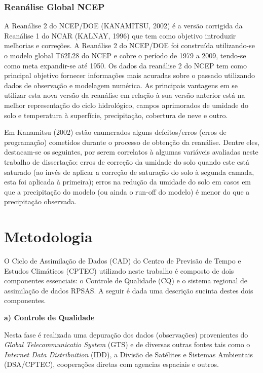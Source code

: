 \subsubsection{Reanálise Global NCEP}

A Reanálise 2 do NCEP/DOE (KANAMITSU, 2002) é a versão corrigida da Reanálise 1 do NCAR (KALNAY, 1996) que tem como objetivo introduzir melhorias e correções. A Reanálise 2 do NCEP/DOE foi construída utilizando-se o modelo global T62L28 do NCEP e cobre o período de 1979 a 2009, tendo-se como meta expandir-se até 1950. Os dados da reanálise 2 do NCEP tem como principal objetivo fornecer informações mais acuradas sobre o passado utilizando dados de observação e modelagem numérica. As principais vantagens em se utilizar esta nova versão da reanálise em relação à sua versão anterior está na melhor representação do ciclo hidrológico, campos aprimorados de umidade do solo e temperatura à superfície, precipitação, cobertura de neve e outro.

Em Kanamitsu (2002) estão enumerados alguns defeitos/erros (erros de programação) cometidos durante o processo de obtenção da reanálise. Dentre eles, destacam-se os seguintes, por serem correlatos à algumas variáveis avaliadas neste trabalho de dissertação: erros de correção da umidade do solo quando este está saturado (ao invés de aplicar a correção de saturação do solo à segunda camada, esta foi aplicada à primeira); erros na redução da umidade do solo em casos em que a precipitação do modelo (ou ainda o run-off do modelo) é menor do que a precipitação observada.

\section{Metodologia}
\label{ss:metodologia}

O Ciclo de Assimilação de Dados (CAD) do Centro de Previsão de Tempo e Estudos Climáticos (CPTEC) utilizado neste trabalho é composto de dois  componentes essenciais: o Controle de Qualidade (CQ) e o sistema regional de assimilação de dados RPSAS. A seguir é dada uma descrição sucinta destes dois componentes.

\textbf{a) Controle de Qualidade}

Nesta fase é realizada uma depuração dos dados (observações) provenientes do \textit{Global Telecommunicatio System} (GTS) e de diversas outras fontes tais como o \textit{Internet Data Distribuition} (IDD), a Divisão de Satélites e Sistemas Ambientais (DSA/CPTEC), cooperações diretas com agencias espaciais e outros.

